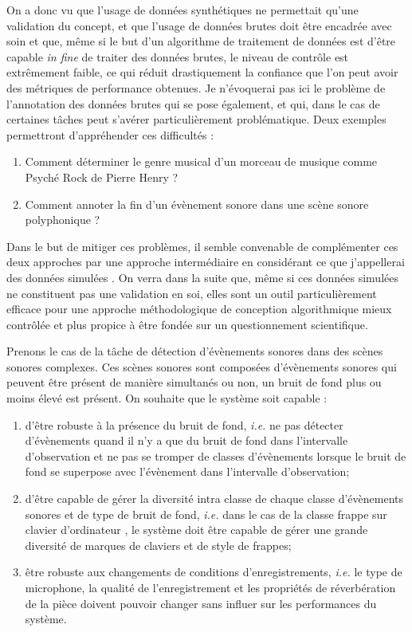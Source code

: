   On a donc vu que l'usage de données synthétiques ne permettait qu'une validation du concept, et que l'usage de données brutes doit être encadrée avec soin et que, même si le but d'un algorithme de traitement de données est d'être capable \textit{in fine} de traiter des données brutes, le niveau de contrôle est extrêmement faible, ce qui réduit drastiquement la confiance que l'on peut avoir des métriques de performance obtenues. Je n'évoquerai pas ici le problème de l'annotation des données brutes qui se pose également, et qui, dans le cas de certaines tâches peut s'avérer particulièrement problématique. Deux exemples permettront d'appréhender ces difficultés :
  \begin{enumerate}
    \item  Comment déterminer le genre musical d'un morceau de musique comme \og Psyché Rock \fg de Pierre Henry ?
    \item Comment annoter la fin d'un évènement sonore dans une scène sonore polyphonique ?
  \end{enumerate}

  Dans le but de mitiger ces problèmes, il semble convenable de complémenter ces deux approches par une approche intermédiaire en considérant ce que j'appellerai des données \og simulées \fg. On verra dans la suite que, même si ces données simulées ne constituent pas une validation en soi, elles sont un outil particulièrement efficace pour une approche méthodologique de conception algorithmique mieux contrôlée et plus propice à être fondée sur un questionnement scientifique.

  Prenons le cas de la tâche de détection d'évènements sonores dans des scènes sonores complexes. Ces scènes sonores sont composées d'évènements sonores qui peuvent être présent de manière simultanés ou non, un bruit de fond plus ou moins élevé est présent. On souhaite que le système soit capable :
  \begin{enumerate}
    \item d'être robuste à la présence du bruit de fond, \textit{i.e.} ne pas détecter d'évènements quand il n'y a que du bruit de fond dans l'intervalle d'observation et ne pas se tromper de classes d'évènements lorsque le bruit de fond se superpose avec l'évènement  dans l'intervalle d'observation;
    \item d'être capable de gérer la diversité intra classe de chaque classe d'évènements sonores et de type de bruit de fond,  \textit{i.e.} dans le cas de la classe \og frappe sur clavier d'ordinateur \fg, le système doit être capable de gérer une grande diversité de marques de claviers et de style de frappes;
    \item être robuste aux changements de conditions d'enregistrements,  \textit{i.e.} le type de microphone, la qualité de l'enregistrement et les propriétés de réverbération de la pièce doivent pouvoir changer sans influer sur les performances du système.
  \end{enumerate}

